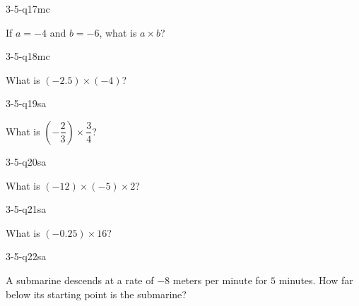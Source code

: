 \begin{practiceQuestion}{3-5-q17}{mc}
\begin{questionText}
If $a = -4$ and $b = -6$, what is $a \times b$?
\end{questionText}
\end{practiceQuestion}

\begin{practiceQuestion}{3-5-q18}{mc}
\begin{questionText}
What is $(-2.5) \times (-4)$?
\end{questionText}
\end{practiceQuestion}


\begin{practiceQuestion}{3-5-q19}{sa}
\begin{questionText}
What is $\left(-\dfrac{2}{3}\right) \times \dfrac{3}{4}$?
\end{questionText}
\end{practiceQuestion}

\begin{practiceQuestion}{3-5-q20}{sa}
\begin{questionText}
What is $(-12) \times (-5) \times 2$?
\end{questionText}
\end{practiceQuestion}

\begin{practiceQuestion}{3-5-q21}{sa}
\begin{questionText}
What is $(-0.25) \times 16$?
\end{questionText}
\end{practiceQuestion}

\begin{practiceQuestion}{3-5-q22}{sa}
\begin{questionText}
A submarine descends at a rate of $-8$ meters per minute for $5$ minutes. How far below its starting point is the submarine?
\end{questionText}
\end{practiceQuestion}

